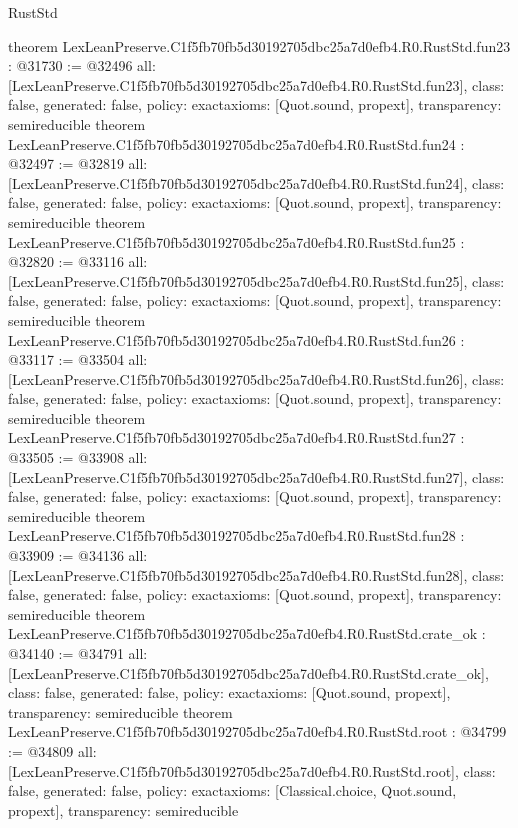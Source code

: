 \begin{lexlean}{RustStd}
\begin{coremodule}
{}
theorem LexLeanPreserve.C1f5fb70fb5d30192705dbc25a7d0efb4.R0.RustStd.fun23 : @31730 := @32496 {
  all: [LexLeanPreserve.C1f5fb70fb5d30192705dbc25a7d0efb4.R0.RustStd.fun23],
  class: false,
  generated: false,
  policy: exact{axioms: [Quot.sound, propext]},
  transparency: semireducible
}
theorem LexLeanPreserve.C1f5fb70fb5d30192705dbc25a7d0efb4.R0.RustStd.fun24 : @32497 := @32819 {
  all: [LexLeanPreserve.C1f5fb70fb5d30192705dbc25a7d0efb4.R0.RustStd.fun24],
  class: false,
  generated: false,
  policy: exact{axioms: [Quot.sound, propext]},
  transparency: semireducible
}
theorem LexLeanPreserve.C1f5fb70fb5d30192705dbc25a7d0efb4.R0.RustStd.fun25 : @32820 := @33116 {
  all: [LexLeanPreserve.C1f5fb70fb5d30192705dbc25a7d0efb4.R0.RustStd.fun25],
  class: false,
  generated: false,
  policy: exact{axioms: [Quot.sound, propext]},
  transparency: semireducible
}
theorem LexLeanPreserve.C1f5fb70fb5d30192705dbc25a7d0efb4.R0.RustStd.fun26 : @33117 := @33504 {
  all: [LexLeanPreserve.C1f5fb70fb5d30192705dbc25a7d0efb4.R0.RustStd.fun26],
  class: false,
  generated: false,
  policy: exact{axioms: [Quot.sound, propext]},
  transparency: semireducible
}
theorem LexLeanPreserve.C1f5fb70fb5d30192705dbc25a7d0efb4.R0.RustStd.fun27 : @33505 := @33908 {
  all: [LexLeanPreserve.C1f5fb70fb5d30192705dbc25a7d0efb4.R0.RustStd.fun27],
  class: false,
  generated: false,
  policy: exact{axioms: [Quot.sound, propext]},
  transparency: semireducible
}
theorem LexLeanPreserve.C1f5fb70fb5d30192705dbc25a7d0efb4.R0.RustStd.fun28 : @33909 := @34136 {
  all: [LexLeanPreserve.C1f5fb70fb5d30192705dbc25a7d0efb4.R0.RustStd.fun28],
  class: false,
  generated: false,
  policy: exact{axioms: [Quot.sound, propext]},
  transparency: semireducible
}
theorem LexLeanPreserve.C1f5fb70fb5d30192705dbc25a7d0efb4.R0.RustStd.crate_ok : @34140 := @34791 {
  all: [LexLeanPreserve.C1f5fb70fb5d30192705dbc25a7d0efb4.R0.RustStd.crate_ok],
  class: false,
  generated: false,
  policy: exact{axioms: [Quot.sound, propext]},
  transparency: semireducible
}
theorem LexLeanPreserve.C1f5fb70fb5d30192705dbc25a7d0efb4.R0.RustStd.root : @34799 := @34809 {
  all: [LexLeanPreserve.C1f5fb70fb5d30192705dbc25a7d0efb4.R0.RustStd.root],
  class: false,
  generated: false,
  policy: exact{axioms: [Classical.choice, Quot.sound, propext]},
  transparency: semireducible
}


\end{coremodule}
\end{lexlean}
